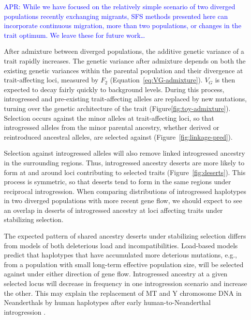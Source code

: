 \documentclass{article}
\newcommand{\aprcomment}[1]{{\textcolor{blue}{APR: #1}}}
\begin{document}
\aprcomment{While we have focused on the relatively simple scenario of two
diverged populations recently exchanging migrants, SFS methods presented here
can incorporate continuous migration, more than two populations, or changes in
the trait optimum. We leave these for future work\dots}

After admixture between diverged populations, the additive genetic variance of
a trait rapidly increases. The genetic variance after admixture depends on both
the existing genetic variances within the parental population and their
divergence at trait-affecting loci, measured by $F_2$
(Equation~\ref{eq:VG-admixture}). $V_G$ is then expected to decay fairly
quickly to background levels. During this process, introgressed and
pre-existing trait-affecting alleles are replaced by new mutations, turning
over the genetic architecture of the trait (Figure\ref{fig:toy-admixture}).
Selection occurs against the minor alleles at trait-affecting loci, so that
introgressed alleles from the minor parental ancestry, whether derived or
reintroduced ancestral alleles, are selected against
(Figure~\ref{fig:linkage-pred}).

Selection against introgressed alleles will also remove linked introgressed
ancestry in the surrounding regions. Thus, introgressed ancestry deserts are
more likely to form at and around loci contributing to selected traits
(Figure~\ref{fig:deserts}). This process is symmetric, so that deserts tend to
form in the same regions under reciprocal introgression. When comparing
distributions of introgressed haplotypes in two diverged populations with more
recent gene flow, we should expect to see an overlap in deserts of introgressed
ancestry at loci affecting traits under stabilizing selection.

The expected pattern of shared ancestry deserts under stabilizing selection
differs from models of both deleterious load and incompatibilities. Load-based
models predict that haplotypes that have accumulated more deterious mutations,
e.g., from a population with small long-term effective population size, will be
selected against under either direction of gene flow. Introgressed ancestry at
a given selected locus will decrease in frequency in one introgression scenario
and increase the other. This may explain the replacement of MT and Y chromosome
DNA in Neanderthals by human haplotypes after early human-to-Neanderthal
introgression \citep{posth2017deeply,petr2020evolutionary}.
\end{document}
